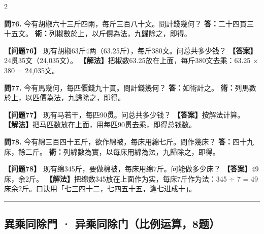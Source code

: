 \documentclass[11pt,a4paper]{article}
\newcommand{\longline}{\noindent\rule{\textwidth}{0.4pt}}
\begin{document}
\begin{paracol}{2}
\switchcolumn*

\textbf{問76.} 今有胡椒六十三斤四兩，每斤三百八十文。問計錢幾何？\break
\textbf{答：}二十四貫三十五文。\break
\textbf{術：}列椒數於上，以斤價為法，九歸除之，即得。

\switchcolumn

\textbf{【问题76】} 现有胡椒63斤4两（63.25斤），每斤380文。问总共多少钱？\break
\textbf{【答案】}24贯35文（24,035文）。\break
\textbf{【解法】}把椒数63.25放在上面，每斤380文去乘：63.25 × 380 = 24,035文。

\switchcolumn*

\textbf{問77.} 今有馬幾何，每匹價錢九十貫。問計錢幾何？\break
\textbf{答：}如術計之。\break
\textbf{術：}列馬數於上，以匹價為法，九歸除之，即得。

\switchcolumn

\textbf{【问题77】} 现有马若干，每匹90贯。问总共多少钱？\break
\textbf{【答案】}按解法计算。\break
\textbf{【解法】}把马匹数放在上面，用每匹90贯去乘，即得总钱数。

\switchcolumn*

\textbf{問78.} 今有綿三百四十五斤，欲作綿被，每床用綿七斤。問作幾床？\break
\textbf{答：}四十九床，餘二斤。\break
\textbf{術：}列綿數為實，以每床用綿為法，九歸除之，即得。

\switchcolumn

\textbf{【问题78】} 现有绵345斤，要做棉被，每床用绵7斤。问能做多少床？\break
\textbf{【答案】}49床，余2斤。\break
\textbf{【解法】}把绵数345放在上面作为实，每床7斤作为法：345 ÷ 7 = 49床余2斤。口诀用「七三四十二，七四五十五，逢七进成十」。

\end{paracol}

\longline

\subsection{異乘同除門 · 异乘同除门（比例运算，8题）}
\label{sec:yicheng}
\end{document}

